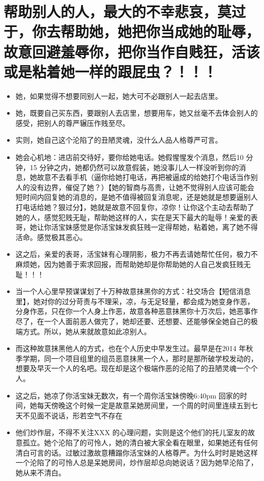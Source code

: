 \documentclass[9pt, b5paper]{article}
\begin{document}
\section{帮助别人的人，最大的不幸悲哀，莫过于，你去帮助她，她把你当成她的耻辱，故意回避羞辱你，把你当作自贱狂，活该或是粘着她一样的跟屁虫？！！！}
\label{sec-5}
\begin{itemize}
\item 她，如果觉得不想要同别人一起，她大可不必跟别人一起去店里。
\item 她，既要自己买东西，要跟别人去店里，想要用车，她又丝毫不去体会别人的感受，把别人的尊严辗压作贱至尽。
\item 实则，她自己这个沦陷了的丑陋灵魂，没什么人品人格尊严可言。
\item 她会心机地：进店前交待好，要你给她电话。她假惺惺发个消息，然后10 分钟，15 分钟之内，她都仍然可以故意假装，她没事儿人一样没听到你的消息，她故意不去看手机（逼你给她打电话，再把被逼成的给她打个电话当作别人的没有边界，催促了她？）【她的智商与高贵，让她不觉得别人应该可能会短时间内回复她的消息的，是她不值得被回复消息呢，还是她就是想要逼别人打电话给她？狠过分】，她就是故意不回复你，凉你！让你这个主动去帮助了她的人，感觉犯贱无耻，帮助她这样的人，实在是天下最大的耻辱！亲爱的表哥，她让你活宝妹感觉是你活宝妹发疯狂贱一定得帮她，粘着她，离了她不得活命。感觉极其恶心。
\item 这之后，亲爱的表哥，活宝妹有心理阴影，极力不再去请她帮忙任何，极力不麻烦她，因为她善于索求回报，而帮助她却是你帮助她的人自己发疯狂贱无耻！！！

\item 当一个人心里早预谋谋划了十万种故意抹黑你的方式：社交场合【短信消息里】，她对你的过分苛责与不理采，凉，与无足轻量，都会成为她变身作恶，分身作恶，只在你一个人身上作恶，故意各种恶意抹黑你十万次后，她恶事作尽了，在一个人面前恶人做完了，她却还要、还想要、还能够保全她自己的极端方式。所以，她从来就故意如此凉别人。
\item 而这种故意抹黑他人的方式，也在个人历史中早发生过。最早是在2014 年秋季学期，同一个项目组里的组员恶意抹黑一个人，那时是那所破学校发动的，想要及早灭一个人的名吧。现在却是这个极端作恶的沦陷了的丑陋灵魂一个个人。

\item 这之后，她凉了你活宝妹无数次，有一个周你活宝妹傍晚6:40pm 回家的时间，她每天傍晚这个时候一定是故意呆她房间里，一个周的时间里连续五到七天不见面不说话，形若空气不存在
\item 他们炒作层，不得不关注XXX 的心理问题，实则是这个他们的托儿室友的故意孤立。她个沦陷了的可怜人，她的清白被大家全看在眼里，如果她还有任何清白可言的话。过敏过激故意糟蹋你活宝妹的人格尊严。为什么时时是她这样一个沦陷了的可怜人总是呆她房间，炒作层却总向她说话？因为她早沦陷了，她从来不清白。


\end{itemize}
\end{document}
